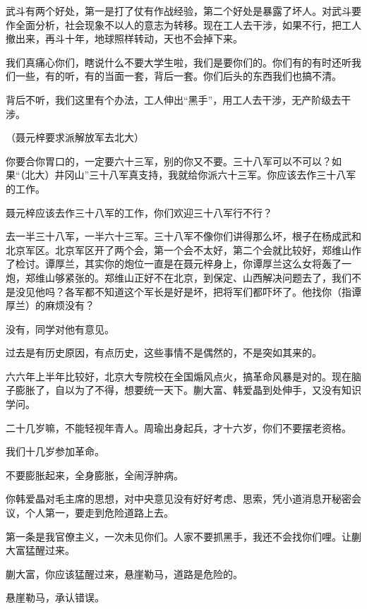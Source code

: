 武斗有两个好处，第一是打了仗有作战经验，第二个好处是暴露了坏人。对武斗要作全面分析，社会现象不以人的意志为转移。现在工人去干涉，如果不行，把工人撤出来，再斗十年，地球照样转动，天也不会掉下来。

我们真痛心你们，瞎说什么不要大学生啦，我们是要你们的。你们有的有时还听我们一些，有的听，有的当面一套，背后一套。你们后头的东西我们也搞不清。

背后不听，我们这里有个办法，工人伸出“黑手”，用工人去干涉，无产阶级去干涉。

（聂元梓要求派解放军去北大）

你要合你胃口的，一定要六十三军，别的你又不要。三十八军可以不可以？如果“（北大）井冈山”三十八军真支持，我就给你派六十三军。你应该去作三十八军的工作。

聂元梓应该去作三十八军的工作，你们欢迎三十八军行不行？

去一半三十八军，一半六十三军。三十八军不像你们讲得那么坏，根子在杨成武和北京军区。北京军区开了两个会，第一个会不太好，第二个会就比较好，郑维山作了检讨。谭厚兰，其实你的炮位一直是在聂元梓身上，你谭厚兰这么女将轰了一炮，郑维山够紧张的。郑维山正好不在北京，到保定、山西解决问题去了，我们不是没见他吗？各军都不知道这个军长是好是坏，把将军们都吓坏了。他找你（指谭厚兰）的麻烦没有？

没有，同学对他有意见。

过去是有历史原因，有点历史，这些事情不是偶然的，不是突如其来的。

六六年上半年比较好，北京大专院校在全国煽风点火，搞革命风暴是对的。现在脑子膨胀了，自以为了不得，想要统一天下。蒯大富、韩爱晶到处伸手，又没有知识学问。

二十几岁嘛，不能轻视年青人。周瑜出身起兵，才十六岁，你们不要摆老资格。

我们十几岁参加革命。

不要膨胀起来，全身膨胀，全闹浮肿病。

你韩爱晶对毛主席的思想，对中央意见没有好好考虑、思索，凭小道消息开秘密会议，个人第一，要走到危险道路上去。

第一条是我官僚主义，一次未见你们。人家不要抓黑手，我还不会找你们哩。让蒯大富猛醒过来。

蒯大富，你应该猛醒过来，悬崖勒马，道路是危险的。

悬崖勒马，承认错误。

